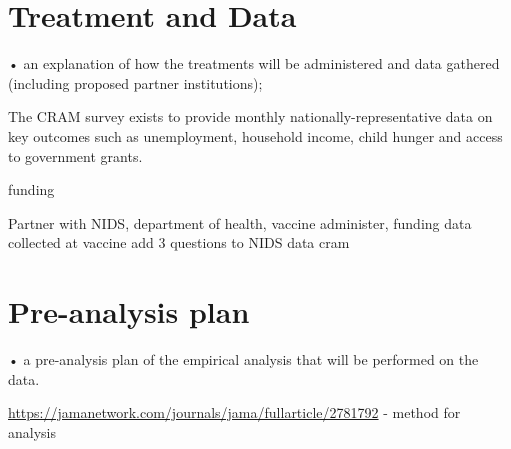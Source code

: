 \documentclass[11pt,preprint, authoryear]{elsarticle}
\numberwithin{equation}{section}
\numberwithin{figure}{section}
\numberwithin{table}{section}
\begin{document}
\hypertarget{treatment-and-data}{%
\section{\texorpdfstring{Treatment and Data
\label{treat}}{Treatment and Data }}\label{treatment-and-data}}

• an explanation of how the treatments will be administered and data
gathered (including proposed partner institutions);

The CRAM survey exists to provide monthly nationally-representative data
on key outcomes such as unemployment, household income, child hunger and
access to government grants.

funding

Partner with NIDS, department of health, vaccine administer, funding
data collected at vaccine add 3 questions to NIDS data cram

\hypertarget{pre-analysis-plan}{%
\section{\texorpdfstring{Pre-analysis plan
\label{pre}}{Pre-analysis plan }}\label{pre-analysis-plan}}

• a pre-analysis plan of the empirical analysis that will be performed
on the data.

\url{https://jamanetwork.com/journals/jama/fullarticle/2781792} - method
for analysis
\end{document}
